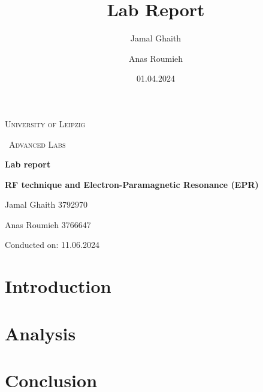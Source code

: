\documentclass{article}
\title{Lab Report}
\author{Jamal Ghaith}
\author{Anas Roumieh}
\date{01.04.2024}
\begin{document}
\begin{titlepage}
	\centering
	{\scshape\LARGE University of Leipzig \par}
	\vspace{1cm}
	{\scshape\ Advanced Labs\par}
	\vspace{1.5cm}
	{\huge\bfseries Lab report\par}
	\vspace{2cm}
	{\huge\bfseries RF technique and Electron-Paramagnetic Resonance (EPR)\par}
	\vspace{2cm}
	{\Large Jamal Ghaith 3792970\par}
    {\Large Anas Roumieh 3766647\par}
	\vfill

    {\Large Conducted on: 11.06.2024 \par}
	\vfill
\end{titlepage}


\tableofcontents
{}
\pagebreak{}

\section{Introduction}

\section{Analysis}

\section{Conclusion}

\pagebreak{}

\begin{appendices}


\end{appendices}

\pagebreak{}

% 
% 
\end{document}
